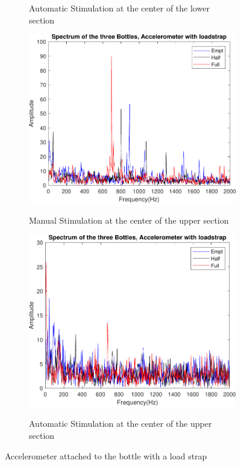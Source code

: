 \begin{figure}[]
\begin{subfigure}{0.45\textwidth}
        \caption{Automatic Stimulation at the center of the lower section}{}
        \label{subfig:ResAcCiAuBot}
    \end{subfigure}
    \begin{subfigure}{0.45\textwidth}
        \centering
        \includegraphics[width=\linewidth]{Chapters/6CHP/Figures/ResultsSensors/AcCiMaTop.pdf}
        \caption{Manual Stimulation at the center of the upper section}{}
        \label{subfig:ResAcCiMaTop}
    \end{subfigure}
    \begin{subfigure}{0.45\textwidth}
        \centering
        \includegraphics[width=\linewidth]{Chapters/6CHP/Figures/ResultsSensors/AcCiAuTop.pdf}
        \caption{Automatic Stimulation at the center of the upper section}{}
        \label{subfig:ResAcCiAuTop}
    \end{subfigure}
    \caption{Accelerometer attached to the bottle with a load strap}{}
    \label{fig:AccLoadStrap}
\end{figure}
